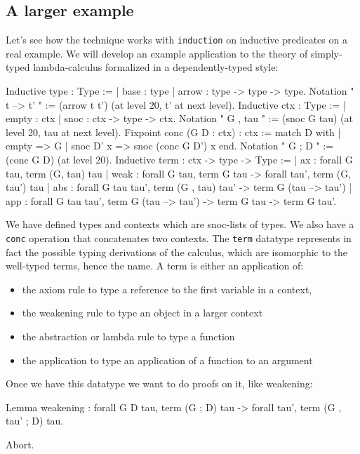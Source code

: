 \subsection{A larger example}

Let's see how the technique works with {\tt induction} on inductive
predicates on a real example. We will develop an example application to the
theory of simply-typed lambda-calculus formalized in a dependently-typed style:

\begin{coq_example*}
Inductive type : Type :=
| base : type
| arrow : type -> type -> type.
Notation " t --> t' " := (arrow t t') (at level 20, t' at next level).
Inductive ctx : Type :=
| empty : ctx
| snoc : ctx -> type -> ctx.
Notation " G , tau " := (snoc G tau) (at level 20, tau at next level).
Fixpoint conc (G D : ctx) : ctx :=
  match D with
    | empty => G
    | snoc D' x => snoc (conc G D') x
  end.
Notation " G ; D " := (conc G D) (at level 20).
Inductive term : ctx -> type -> Type :=
| ax : forall G tau, term (G, tau) tau
| weak : forall G tau, 
  term G tau -> forall tau', term (G, tau') tau
| abs : forall G tau tau', 
  term (G , tau) tau' -> term G (tau --> tau')
| app : forall G tau tau', 
  term G (tau --> tau') -> term G tau -> term G tau'.
\end{coq_example*}

We have defined types and contexts which are snoc-lists of types. We
also have a {\tt conc} operation that concatenates two contexts.
The {\tt term} datatype represents in fact the possible typing
derivations of the calculus, which are isomorphic to the well-typed
terms, hence the name. A term is either an application of:
\begin{itemize}
\item the axiom rule to type a reference to the first variable in a context,
\item the weakening rule to type an object in a larger context
\item the abstraction or lambda rule to type a function
\item the application to type an application of a function to an argument
\end{itemize}

Once we have this datatype we want to do proofs on it, like weakening:

\begin{coq_example*}
Lemma weakening : forall G D tau, term (G ; D) tau -> 
  forall tau', term (G , tau' ; D) tau.
\end{coq_example*}
\begin{coq_eval}
  Abort.
\end{coq_eval}

